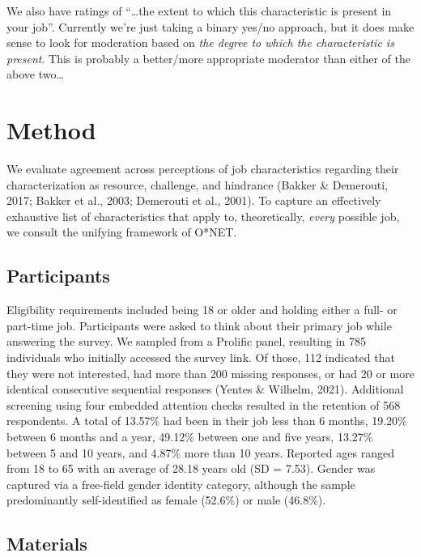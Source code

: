 \documentclass[
  man]{apa6}
\begin{document}
We also have ratings of ``\ldots the extent to which this characteristic is present in your job''. Currently we're just taking a binary yes/no approach, but it does make sense to look for moderation based on \emph{the degree to which the characteristic is present}. This is probably a better/more appropriate moderator than either of the above two\ldots{}

\hypertarget{method}{%
\section{Method}\label{method}}

We evaluate agreement across perceptions of job characteristics regarding their characterization as resource, challenge, and hindrance (Bakker \& Demerouti, 2017; Bakker et al., 2003; Demerouti et al., 2001). To capture an effectively exhaustive list of characteristics that apply to, theoretically, \emph{every} possible job, we consult the unifying framework of O*NET.

\hypertarget{participants}{%
\subsection{Participants}\label{participants}}

Eligibility requirements included being 18 or older and holding either a full- or part-time job. Participants were asked to think about their primary job while answering the survey. We sampled from a Prolific panel, resulting in 785 individuals who initially accessed the survey link. Of those, 112 indicated that they were not interested, had more than 200 missing responses, or had 20 or more identical consecutive sequential responses (Yentes \& Wilhelm, 2021). Additional screening using four embedded attention checks resulted in the retention of 568 respondents. A total of 13.57\% had been in their job less than 6 months, 19.20\% between 6 months and a year, 49.12\% between one and five years, 13.27\% between 5 and 10 years, and 4.87\% more than 10 years. Reported ages ranged from 18 to 65 with an average of 28.18 years old (SD = 7.53). Gender was captured via a free-field gender identity category, although the sample predominantly self-identified as female (52.6\%) or male (46.8\%).

\hypertarget{materials}{%
\subsection{Materials}\label{materials}}
\end{document}
